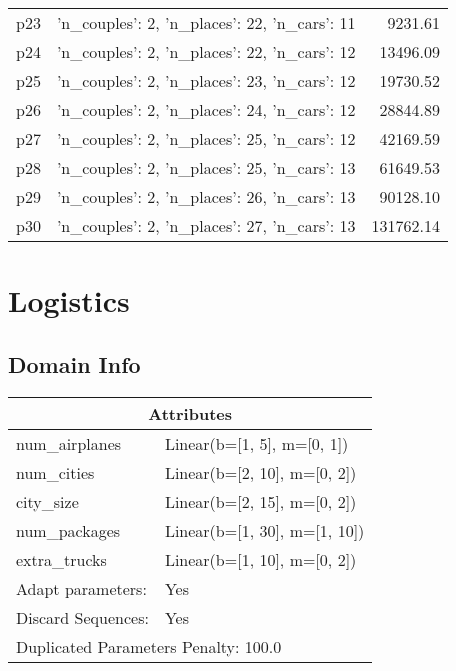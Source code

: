 \documentclass{article}
\begin{document}
\begin{center}
\begin{tabular}{@{}l|r|r@{}}
  p23&{'n\_couples': 2, 'n\_places': 22, 'n\_cars': 11}&9231.61\\
  p24&{'n\_couples': 2, 'n\_places': 22, 'n\_cars': 12}&13496.09\\
  p25&{'n\_couples': 2, 'n\_places': 23, 'n\_cars': 12}&19730.52\\
  p26&{'n\_couples': 2, 'n\_places': 24, 'n\_cars': 12}&28844.89\\
  p27&{'n\_couples': 2, 'n\_places': 25, 'n\_cars': 12}&42169.59\\
  p28&{'n\_couples': 2, 'n\_places': 25, 'n\_cars': 13}&61649.53\\
  p29&{'n\_couples': 2, 'n\_places': 26, 'n\_cars': 13}&90128.10\\
  p30&{'n\_couples': 2, 'n\_places': 27, 'n\_cars': 13}&131762.14
                            \end{tabular}
                            \end{center}
                    
                            \newpage \section{Logistics}
                    \subsection*{Domain Info}

                    \begin{center}
                    \begin{tabular}{@{}p{}p{}@{}}
                    \multicolumn{2}{c}{\bf \large Attributes}\\\midrule
                    num\_airplanes & Linear(b=[1, 5], m=[0, 1])\\
num\_cities & Linear(b=[2, 10], m=[0, 2])\\
city\_size & Linear(b=[2, 15], m=[0, 2])\\
num\_packages & Linear(b=[1, 30], m=[1, 10])\\
extra\_trucks & Linear(b=[1, 10], m=[0, 2])
                    
                    \\\midrule
                    Adapt parameters: & Yes
                
                    
                                \\\midrule
                                Discard Sequences: & Yes
                             \\\midrule
                    \multicolumn{2}{l}{Duplicated Parameters Penalty: 100.0}
                    \end{tabular}
                    \end{center}
                
\end{document}
